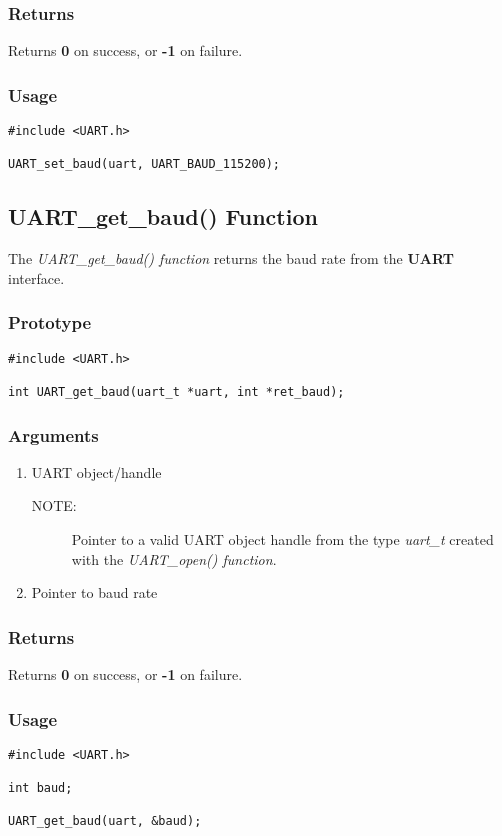 \documentclass{report}
\begin{document}
\subsubsection*{Returns}
Returns \textbf{0} on success, or \textbf{-1} on failure.
\subsubsection*{Usage}
\begin{lstlisting}
#include <UART.h>

UART_set_baud(uart, UART_BAUD_115200);
\end{lstlisting}
\subsection{UART\_get\_baud() Function}
The \textit{UART\_get\_baud() function} returns the baud rate
from the \textbf{UART} interface.
\subsubsection*{Prototype}
\begin{lstlisting}
#include <UART.h>

int UART_get_baud(uart_t *uart, int *ret_baud);
\end{lstlisting}
\subsubsection*{Arguments}
\begin{enumerate}
\item UART object/handle
\begin{description}
\item[NOTE:] Pointer to a valid UART object handle from the type \textit{uart\_t}
created with the \textit{UART\_open() function}.
\end{description}
\item Pointer to baud rate
\end{enumerate}
\subsubsection*{Returns}
Returns \textbf{0} on success, or \textbf{-1} on failure.
\subsubsection*{Usage}
\begin{lstlisting}
#include <UART.h>

int baud;

UART_get_baud(uart, &baud);
\end{lstlisting}
\end{document}
